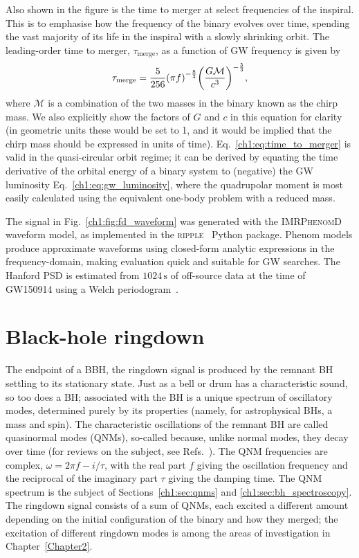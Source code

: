 Also shown in the figure is the time to merger at select frequencies of the inspiral.
This is to emphasise how the frequency of the binary evolves over time, spending the vast majority of its life in the inspiral with a slowly shrinking orbit.
The leading-order time to merger, $\tau_\mathrm{merge}$, as a function of GW frequency is given by
\begin{equation}\label{ch1:eq:time_to_merger}
    \tau_\mathrm{merge} = \frac{5}{256} \qty(\pi f)^{-\frac{8}{3}} \qty(\frac{G\mathcal{M}}{c^3})^{-\frac{5}{3}},
\end{equation}
where $\mathcal{M}$ is a combination of the two masses in the binary known as the chirp mass.
We also explicitly show the factors of $G$ and $c$ in this equation for clarity (in geometric units these would be set to 1, and it would be implied that the chirp mass should be expressed in units of time). 
Eq.~\ref{ch1:eq:time_to_merger} is valid in the quasi-circular orbit regime; it can be derived by equating the time derivative of the orbital energy of a binary system to (negative) the GW luminosity Eq.~\ref{ch1:eq:gw_luminosity}, where the quadrupolar moment is most easily calculated using the equivalent one-body problem with a reduced mass.

The signal in Fig.~\ref{ch1:fig:fd_waveform} was generated with the \textsc{IMRPhenomD}~\cite{Khan:2015jqa} waveform model, as implemented in the \textsc{ripple}~\cite{Edwards:2023sak} Python package.
Phenom models produce approximate waveforms using closed-form analytic expressions in the frequency-domain, making evaluation quick and suitable for GW searches.
The Hanford PSD is estimated from $1024\,\mathrm{s}$ of off-source data at the time of GW150914 using a Welch periodogram~\cite{1161901}.


\section{Black-hole ringdown}
\label{ch1:sec:bh_ringdown}

The endpoint of a BBH, the ringdown signal is produced by the remnant BH settling to its stationary state.
Just as a bell or drum has a characteristic sound, so too does a BH; associated with the BH is a unique spectrum of oscillatory modes, determined purely by its properties (namely, for astrophysical BHs, a mass and spin).
The characteristic oscillations of the remnant BH are called quasinormal modes (QNMs), so-called because, unlike normal modes, they decay over time (for reviews on the subject, see Refs.~\cite{Kokkotas:1999bd, Nollert:1999ji, Ferrari:2007dd, Berti:2009kk}).
The QNM frequencies are complex, $\omega = 2\pi f - i/\tau$, with the real part $f$ giving the oscillation frequency and the reciprocal of the imaginary part $\tau$ giving the damping time. 
The QNM spectrum is the subject of Sections~\ref{ch1:sec:qnms} and \ref{ch1:sec:bh_spectroscopy}.
The ringdown signal consists of a sum of QNMs, each excited a different amount depending on the initial configuration of the binary and how they merged; the excitation of different ringdown modes is among the areas of investigation in Chapter~\ref{Chapter2}.

